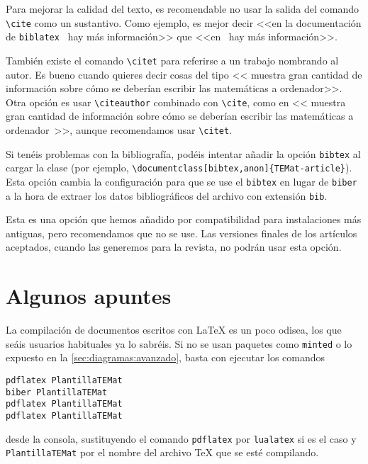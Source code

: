 \documentclass[bibtex]{TEMat-article}
\begin{document}
\begin{nota}
Para mejorar la calidad del texto, es recomendable no usar la salida del comando \verb+\cite+ como un sustantivo.
Como ejemplo, es mejor decir <<en la documentación de \texttt{biblatex}~\cite{biblatex} hay más información>> que <<en~\cite{biblatex} hay más información>>.

También existe el comando \verb+\citet+ para referirse a un trabajo nombrando al autor.
Es bueno cuando quieres decir cosas del tipo <<\citet{bezosOM} muestra gran cantidad de información sobre cómo se deberían escribir las matemáticas a ordenador>>. Otra opción es usar \verb+\citeauthor+ combinado con \verb+\cite+, como en <<\citeauthor{bezosOM} muestra gran cantidad de información sobre cómo se deberían escribir las matemáticas a ordenador~\cite{bezosOM}>>, aunque recomendamos usar \verb+\citet+.
\end{nota}

\begin{nota}
Si tenéis problemas con la bibliografía, podéis intentar añadir la opción \verb+bibtex+ al cargar la clase (por ejemplo, \verb+\documentclass[bibtex,anon]{TEMat-article}+).
Esta opción cambia la configuración para que se use el  \verb+bibtex+ en lugar de \verb+biber+ a la hora de extraer los datos bibliográficos del archivo con extensión \verb+bib+.

Esta es una opción que hemos añadido por compatibilidad para instalaciones más antiguas, pero recomendamos que no se use.
Las versiones finales de los artículos aceptados, cuando las generemos para la revista, no podrán usar esta opción.
\end{nota}

\section{Algunos apuntes}\label{sec:apuntes}
La compilación de documentos escritos con \LaTeX{} es un poco odisea, los que seáis usuarios habituales ya lo sabréis.
Si no se usan paquetes como \verb+minted+ o lo expuesto en la \cref{sec:diagramas:avanzado}, basta con ejecutar los comandos
\begin{verbatim}
pdflatex PlantillaTEMat
biber PlantillaTEMat
pdflatex PlantillaTEMat
pdflatex PlantillaTEMat
\end{verbatim}
desde la consola, sustituyendo el comando \verb+pdflatex+ por \verb+lualatex+ si es el caso y \verb+PlantillaTEMat+ por el nombre del archivo \TeX{} que se esté compilando.
\end{document}
